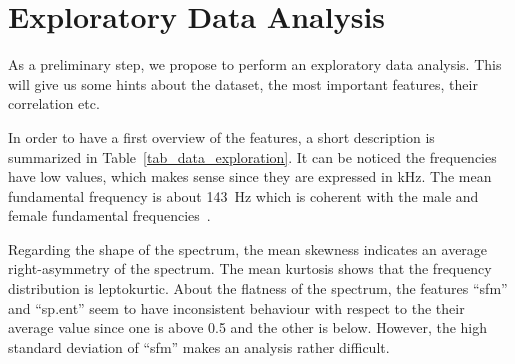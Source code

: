\chapter{Exploratory Data Analysis}
\label{chapter_data_exploration}

As a preliminary step, we propose to perform an exploratory data analysis. This will give us some hints about the dataset, \eg the most important features, their correlation etc.

In order to have a first overview of the features, a short description is summarized in Table~\ref{tab_data_exploration}. It can be noticed the frequencies have low values, which makes sense since they are expressed in \si{\kilo\hertz}. 
The mean fundamental frequency is about \SI{143}{\hertz} which is coherent with the male and female fundamental frequencies~\cite{Traunmller1994}. 

Regarding the shape of the spectrum, the mean skewness indicates an average right-asymmetry of the spectrum. The mean kurtosis shows that the frequency distribution is leptokurtic. About the flatness of the spectrum, the features ``sfm'' and ``sp.ent'' seem to have inconsistent behaviour with respect to the their average value since one is above \num{0.5} and the other is below. However, the high standard deviation of ``sfm'' makes an analysis rather difficult.

